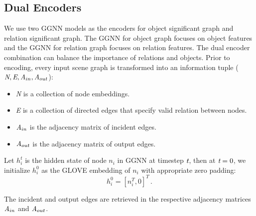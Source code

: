 \documentclass[letterpaper]{article} %
\begin{document}
\subsection{Dual Encoders}
We use two GGNN models as the encoders for object significant graph and relation significant graph. 
The GGNN for object graph focuses on object features and the GGNN for relation graph focuses on relation features. 
The dual encoder combination can balance the importance of relations and objects.
Prior to encoding, every input scene graph is transformed into an information tuple ($\emph{N}, \emph{E}, \emph{A}_{in}, \emph{A}_{out}$):\vspace{-0.02in}
\begin{itemize}
\setlength{\itemsep}{5pt}
\setlength{\parsep}{5pt}
\setlength{\parskip}{5pt}
    \item \emph{N} is a collection of node embeddings.\vspace{-0.06in}
    \item \emph{E} is a collection of directed edges that specify valid relation between nodes.\vspace{-0.06in}
    \item $\emph{A}_{in}$ is the adjacency matrix of incident edges.\vspace{-0.06in}
    \item $\emph{A}_{out}$ is the adjacency matrix of output edges.\vspace{-0.06in}
\end{itemize}

Let $h_i^t$ is the hidden state of node $n_i$ in GGNN at timestep $\emph{t}$, then at $\emph{t}=0$, we initialize $h_i^0$ as the GLOVE embedding of $n_i$ with appropriate zero padding:
\begin{equation}
    h_i^0 = [n_i^T, 0]^T  \, .
\end{equation}

The incident and output edges are retrieved in the respective adjacency matrices $\emph{A}_{in}$ and $\emph{A}_{out}$. 
\end{document}
